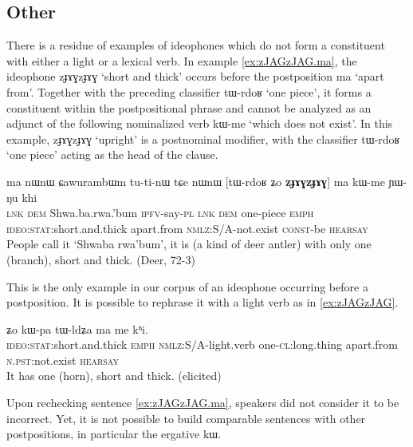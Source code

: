 \documentclass[oldfontcommands,oneside,a4paper,11pt]{article}
\newcommand{\ipa}[1]{{\phon \mbox{#1}}} %
\begin{document}


    \subsection{Other}
   There is a residue of examples of ideophones which do not form a constituent with either a light or a lexical verb. In example \ref{ex:zJAGzJAG.ma}, the ideophone 	\ipa{zɟɤɣzɟɤɣ} `short and thick' occurs before the postposition \ipa{ma} `apart from'. Together with the preceding classifier \ipa{tɯ-rdoʁ}  `one piece', it forms a constituent within the postpositional phrase and cannot be analyzed as an adjunct of the following nominalized verb  	\ipa{kɯ-me} `which does not exist'. In this example, 	\ipa{zɟɤɣzɟɤɣ} `upright' is a postnominal modifier, with the classifier \ipa{tɯ-rdoʁ} `one piece' acting as  the head of the clause.
   
    \begin{exe}
\ex \label{ex:zJAGzJAG.ma}
\gll 
\ipa{ma} 	\ipa{nɯnɯ} 	\ipa{ɕawurambɯm} 	\ipa{tu-ti-nɯ} 	\ipa{tɕe} 	\ipa{nɯnɯ} 	 [\ipa{tɯ-rdoʁ} 	\ipa{ʑo} 	\ipa{\textbf{zɟɤɣzɟɤɣ}}] 	\ipa{ma} 	\ipa{kɯ-me} 	\ipa{ɲɯ-ŋu} 	\ipa{khi} \\
\textsc{lnk} \textsc{dem} Shwa.ba.rwa.'bum \textsc{ipfv}-say-\textsc{pl} \textsc{lnk} \textsc{dem} one-piece \textsc{emph} \textsc{ideo:stat}:short.and.thick apart.from \textsc{nmlz}:S/A-not.exist \textsc{const}-be \textsc{hearsay} \\
\glt People call it `Shwaba rwa'bum', it is (a  kind of deer antler) with only one (branch), short and thick. 
 (Deer, 72-3)
\end{exe}

This is the only example in our corpus of an ideophone occurring before a postposition. It is possible to rephrase it with a light verb as in \ref{ex:zJAGzJAG}.  
    \begin{exe}
\ex \label{ex:zJAGzJAG}
\gll \ipa{\textbf{zɟɤɣzɟɤɣ}} 	\ipa{ʑo} 	\ipa{kɯ-pa} 	\ipa{tɯ-ldʑa} 	\ipa{ma} 	\ipa{me} 	\ipa{kʰi.}  \\
\textsc{ideo:stat}:short.and.thick \textsc{emph} \textsc{nmlz}:S/A-light.verb one-\textsc{cl}:long.thing apart.from \textsc{n.pst}:not.exist \textsc{hearsay} \\
\glt It  has one (horn), short and thick. (elicited)
\end{exe}

Upon rechecking  sentence \ref{ex:zJAGzJAG.ma}, speakers did not consider it to be incorrect. Yet,  it is not possible to build comparable sentences with other postpositions, in particular the ergative \ipa{kɯ}. 
\end{document}
